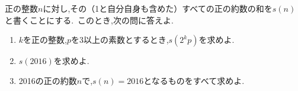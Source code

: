 \begin{problem}
正の整数$n$に対し,その（1と自分自身も含めた）すべての正の約数の和を$s(n)$と書くことにする.\, このとき,次の問に答えよ.
  \begin{enumerate}
    \item $k$を正の整数,$p$を3以上の素数とするとき,$s(2^kp)$を求めよ.
    \item $s(2016)$を求めよ.
    \item 2016の正の約数$n$で,$s(n)=2016$となるものをすべて求めよ.
  \end{enumerate}
\end{problem}
